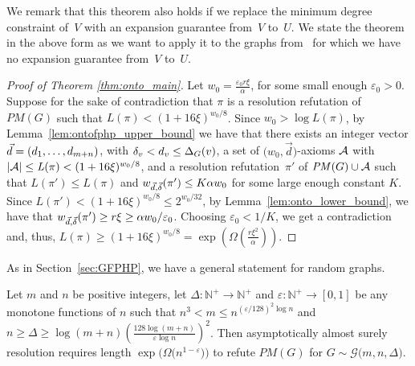 \documentclass{theoretics}
\newcommand{\BIGOMEGA}[1]{\Omega \left( #1 \right)}
\newcommand{\Nplus}     {\mathbb{N}^{+}}
\newcommand{\funcdescr}[3]{\ensuremath{ #1 : #2 \to #3}}
\newcommand{\setsize}[1]{\lvert#1\rvert}
\newcommand{\refsec}[1]{Section~\ref{#1}}
\newcommand{\reflem}[1]{Lemma~\ref{#1}}
\newcommand{\refpi}{\pi}
\newcommand{\genericformsmall}[2]{\mathit{#1}( #2 )}
\newcommand{\length}[1]{\genericformsmall{L}{#1}}
\newcommand{\width}[2][]{\genericformsmall{W_{#1}}{#2}}
\newcommand{\formulaformat}[1]{\mathit{#1}}
\newcommand{\numpigeons}{m}
\newcommand{\numholes}{n}
\newcommand{\PM}{PM(G)}
\renewcommand{\PM}{\formulaformat{PM}(G)}
\renewcommand{\deg}[2][XXXXXXXXXXXX]{\Delta_{#1}(#2)}
\newcommand{\diff}{\xi}
\newcommand{\GdegMax}{\Delta}
\newcommand{\gdegmax}{\GdegMax}
\newcommand{\Gdist}{\mathcal{G}}
\newcommand{\constonto}{128}
\newcommand{\exponentalpha}{\varepsilon}
\newcommand{\Ax}{\ensuremath\mathcal{A}}
\newcommand{\thr}[1]{ \ensuremath d_{{#1}} }
\newcommand{\vecthr}{\vec{d}}
\newcommand{\vecthrdef}[1]{\vecthr = \left(\thr{1}, \ldots, \thr{#1}\right)}
\newcommand{\adv}[1]{\delta_{{#1}}}
\newcommand{\vecadv}{\vec{\delta}}
\newcommand{\fakeaxiom}{$\bigl( w_0, \vecthr \bigr)$-axiom\xspace}
\renewcommand{\width}[1]{\ensuremath w_{\vecthr,\vecadv}( #1 )}
\numberwithin{equation}{section}
\begin{document}
We remark that this 
theorem also holds if we replace the minimum degree constraint of~$V$
with an expansion guarantee from~$V$ to~$U$.
We state the theorem
in the above form as we want to apply it to the graphs
from~\cite{GUV09Unbalanced} for which we have no expansion guarantee
from~$V$ to~$U$. 



\begin{proof}[Proof of Theorem \ref{thm:onto_main}]
  Let
  $w_0 = \frac{\varepsilon_0 r \diff}{ \alpha }$, 
  for some small enough $\varepsilon_0 > 0$. 
  Suppose for the sake of contradiction that $\refpi$ is a resolution refutation 
  of~$\PM$ such that 
  $\length{\refpi} < (1 + 16\diff)^{w_0/8}$. Since $w_0 > \log \length{\refpi}$, by \reflem{lem:ontofphp_upper_bound} we have that
  there exists 
  an integer vector $\vecthrdef{\numpigeons + \numholes}$, with 
  $\adv{v} < \thr{v} \le \deg[G]{v}$,
  a set of \fakeaxiom{s} $\Ax$
  with 
  $\setsize{\Ax} \le \length{\refpi} < (1 + 16\diff)^{w_0/8}$, 
  and a resolution refutation~$\refpi'$ of $\PM \cup \Ax$ such that 
  $\length{\refpi'} \leq \length{\refpi}$  
  and
  $\width{\refpi'} \le K{\alpha  w_0}$ for some large enough constant $K$.
  Since $\length{\refpi'} < (1 + 16\diff)^{w_0/8} \leq 2^{w_0/32}$,
  by \reflem{lem:onto_lower_bound}, we have that 
  $\width{\refpi'} \ge r \diff \ge {\alpha w_0}/{\varepsilon_0}$. 
  Choosing $\varepsilon_0 < 1/K$, we get a contradiction
  and, thus, $\length{\refpi} \geq (1 + 16\diff)^{w_0/8} = 
  \exp\left(\BIGOMEGA{\frac{r \diff^2}{\alpha}}\right)$.
\end{proof}

As in \refsec{sec:GFPHP}, we have a general statement for random graphs.

\begin{corollary}\label{cor:onto_random_main}
  Let $m$ and $n$ be positive integers, 
  let
  $\funcdescr{\gdegmax}{\Nplus}{\Nplus}$ and
  $\funcdescr{\exponentalpha}{\Nplus}{[0,1]}$ be any monotone
  functions of $n$ such that 
  $n^3 < m \le n^{\left( \exponentalpha/\constonto \right)^2 \log n}$ 
  and 
  $n \ge 
  \gdegmax \ge 
  \log (m+n) 
  \left( \frac{\constonto \log (m + n)}{\exponentalpha \log n} \right)^2$. 
  Then asymptotically almost surely resolution requires length 
  $\exp{\bigl(\Omega\bigl(n^{1-\exponentalpha}\bigr)\bigr)}$ 
  to refute $\PM$ 
  for $G \sim \Gdist \bigl(m,n,\GdegMax \bigr)$.
\end{corollary}
\end{document}
